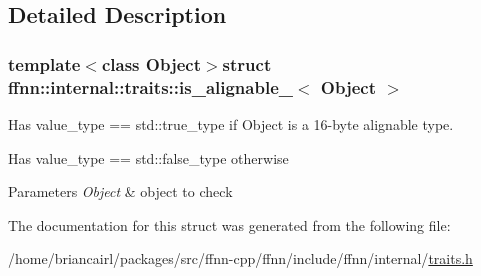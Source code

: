 \subsection{Detailed Description}
\subsubsection*{template$<$class Object$>$struct ffnn\-::internal\-::traits\-::is\-\_\-alignable\-\_$<$ Object $>$}

Has {\ttfamily value\-\_\-type == std\-::true\-\_\-type} if {\ttfamily Object} is a 16-\/byte alignable type. 

Has {\ttfamily value\-\_\-type == std\-::false\-\_\-type} otherwise 
\begin{DoxyParams}{Parameters}
{\em Object} & object to check \\
\hline
\end{DoxyParams}


The documentation for this struct was generated from the following file\-:\begin{DoxyCompactItemize}
\item 
/home/briancairl/packages/src/ffnn-\/cpp/ffnn/include/ffnn/internal/\hyperlink{traits_8h}{traits.\-h}\end{DoxyCompactItemize}
